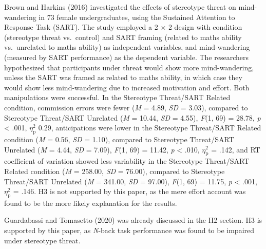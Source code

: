 \documentclass[
  stu, a4paper,floatsintext]{apa7}
\begin{document}
Brown and Harkins (2016) investigated the effects of stereotype threat on mind-wandering in 73 female undergraduates, using the Sustained Attention to Response Task (SART).
The study employed a 2 \(\times\) 2 design with condition (stereotype threat vs.~control) and SART framing (related to maths ability vs.~unrelated to maths ability) as independent variables, and mind-wandering (measured by SART performance) as the dependent variable. The researchers hypothesized that participants under threat would show more mind-wandering, unless the SART was framed as related to maths ability, in which case they would show less mind-wandering due to increased motivation and effort.
Both manipulations were successful.
In the Stereotype Threat/SART Related condition, commission errors were fewer (\emph{M} = 4.89, \emph{SD} = 3.03), compared to Stereotype Threat/SART Unrelated (\emph{M} = 10.44, \emph{SD} = 4.55), \emph{F}(1, 69) = 28.78, \emph{p} \textless{} .001, \(\eta^{2}_{\text{p}}\) 0.29, anticipations were lower in the Stereotype Threat/SART Related condition (\emph{M} = 0.56, \emph{SD} = 1.10), compared to Stereotype Threat/SART Unrelated (\emph{M} = 4.44, \emph{SD} = 7.09), \emph{F}(1, 69) = 11.42, \emph{p} \textless{} .010, \(\eta^{2}_{\text{p}}\) = .142, and RT coefficient of variation showed less variability in the Stereotype Threat/SART Related condition (\emph{M} = 258.00, \emph{SD} = 76.00), compared to Stereotype Threat/SART Unrelated (\emph{M} = 341.00, \emph{SD} = 97.00), \emph{F}(1, 69) = 11.75, \emph{p} \textless{} .001, \(\eta^{2}_{\text{p}}\) = .146.
H3 is not supported by this paper, as the mere effort account was found to be the more likely explanation for the results.

Guardabassi and Tomasetto (2020) was already discussed in the H2 section.
H3 is supported by this paper, as \emph{N}-back task performance was found to be impaired under stereotype threat.
\end{document}
